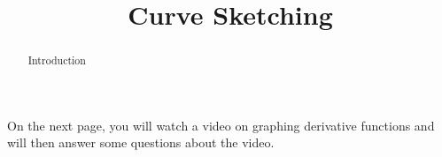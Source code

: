 \documentclass[handout]{ximera}
\title{Curve Sketching}
\begin{document}
\begin{abstract} Introduction %
\end{abstract}

\maketitle

On the next page, you will watch a video on graphing derivative functions and will then answer some questions about the video.
\end{document}
